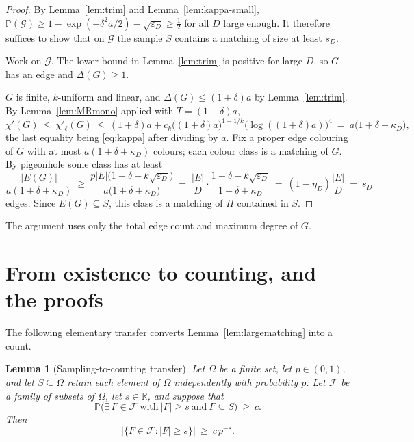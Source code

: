 \documentclass[10pt,a4paper]{amsart}
\newtheorem{lemma}[theorem]{Lemma}
\newcommand{\EE}{E}
\newcommand{\PP}{\mathbb{P}}
\newcommand{\chil}{\chi'_{\ell}}
\newcommand{\Deltaop}{\Delta}
\begin{document}
\begin{proof}
By Lemma~\ref{lem:trim} and Lemma~\ref{lem:kappa-small},
$\PP(\mathcal{G})\ge1-\exp(-\delta^2a/2)-\sqrt{\varepsilon_D}\ge\tfrac12$ for all
$D$ large enough. It therefore suffices to show that on $\mathcal{G}$ the sample $S$
contains a matching of size at least $s_D$.

Work on $\mathcal{G}$. The lower bound in Lemma~\ref{lem:trim} is positive for large
$D$, so $G$ has an edge and $\Deltaop(G)\ge1$.

$G$ is finite, $k$-uniform and linear, and $\Deltaop(G)\le(1+\delta)a$ by
Lemma~\ref{lem:trim}. By Lemma~\ref{lem:MRmono} applied with $T=(1+\delta)a$,
\[
  \chi'(G)\ \le\ \chil(G)\ \le\
  (1+\delta)a+c_k\bigl((1+\delta)a\bigr)^{1-1/k}\bigl(\log((1+\delta)a)\bigr)^4
  \ =\ a\bigl(1+\delta+\kappa_D\bigr),
\]
the last equality being \eqref{eq:kappa} after dividing by $a$. Fix a proper edge
colouring of $G$ with at most $a(1+\delta+\kappa_D)$ colours; each colour class is a
matching of $G$. By pigeonhole some class has at least
\[
  \frac{|E(G)|}{a(1+\delta+\kappa_D)}
  \ \ge\ \frac{p|\EE|\bigl(1-\delta-k\sqrt{\varepsilon_D}\bigr)}
              {a\bigl(1+\delta+\kappa_D\bigr)}
  \ =\ \frac{|\EE|}{D}\cdot
        \frac{1-\delta-k\sqrt{\varepsilon_D}}{1+\delta+\kappa_D}
  \ =\ (1-\eta_D)\frac{|\EE|}{D}\ =\ s_D
\]
edges. Since $E(G)\subseteq S$, this class is a matching of $H$ contained in $S$.
\end{proof}

The argument uses only the total edge count and maximum degree of $G$.

\section{From existence to counting, and the proofs}
\label{sec:proof}

The following elementary transfer converts Lemma~\ref{lem:largematching} into a count.

\begin{lemma}[Sampling-to-counting transfer]
\label{lem:transfer}
Let $\Omega$ be a finite set, let $p\in(0,1)$, and let $S\subseteq\Omega$ retain each
element of $\Omega$ independently with probability $p$. Let $\mathcal{F}$ be a family of
subsets of $\Omega$, let $s\in\mathbb{R}$, and suppose that
\[
  \PP\bigl(\exists\,F\in\mathcal{F}\ \text{with}\ |F|\ge s\ \text{and}\ F\subseteq S\bigr)
  \ \ge\ c .
\]
Then
\[
  \bigl|\{F\in\mathcal{F}: |F|\ge s\}\bigr|\ \ge\ c\,p^{-s}.
\]
\end{lemma}
\end{document}
